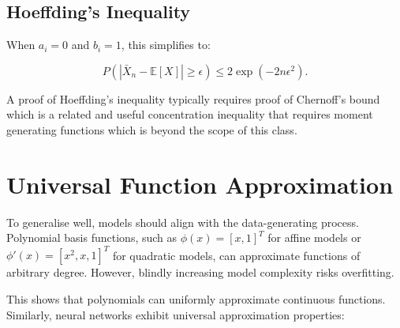 \subsection{Hoeffding's Inequality}


When $a_i = 0$ and $b_i = 1$, this simplifies to:

\[
    P\left(\left| \bar{X}_n - \mathbb{E}[X] \right| \geq \epsilon\right) \leq 2 \exp(-2n \epsilon^2).
\]

A proof of Hoeffding’s inequality typically requires proof of Chernoff’s bound which is a related and useful concentration inequality that requires moment generating functions which is beyond the scope of this class.

\section{Universal Function Approximation}

To generalise well, models should align with the data-generating process. Polynomial basis functions, such as $\phi(x) = [x, 1]^T$ for affine models or $\phi'(x) = [x^2, x, 1]^T$ for quadratic models, can approximate functions of arbitrary degree. However, blindly increasing model complexity risks overfitting.


This shows that polynomials can uniformly approximate continuous functions. Similarly, neural networks exhibit universal approximation properties:



